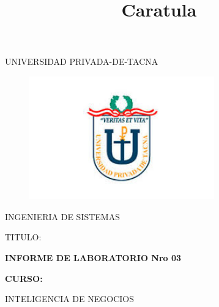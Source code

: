 \documentclass[12pt,letterpaper]{article}
\begin{document}
%


\title{Caratula}

\begin{titlepage}
\begin{center}
\large{UNIVERSIDAD PRIVADA-DE-TACNA}\\
\vspace*{-0.025in}
\begin{figure}[htb]
\begin{center}
\includegraphics[width=8cm]{./Imagenes/logo}
\end{center}
\end{figure}
\vspace*{0.15in}
INGENIERIA DE SISTEMAS  \\

\vspace*{0.5in}
\begin{large}
TITULO:\\
\end{large}

\vspace*{0.1in}
\begin{Large}
\textbf{INFORME DE LABORATORIO Nro 03} \\
\end{Large}

\vspace*{0.3in}
\begin{Large}
\textbf{CURSO:} \\
\end{Large}

\vspace*{0.1in}
\begin{large}
INTELIGENCIA DE NEGOCIOS\\
\end{large}


\end{center}
\end{titlepage}
\end{document}
